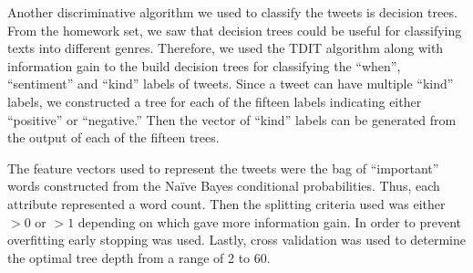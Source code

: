 	Another discriminative algorithm we used to classify the tweets is decision trees. From the homework set, we saw that decision trees could be useful for classifying texts into different genres. Therefore, we used the TDIT algorithm along with information gain to the build decision trees for classifying the ``when'', ``sentiment'' and ``kind'' labels of tweets. Since a tweet can have multiple ``kind'' labels, we constructed a tree for each of the fifteen labels indicating either ``positive'' or ``negative.'' Then the vector of ``kind'' labels can be generated from the output of each of the fifteen trees.

	The feature vectors used to represent the tweets were the bag of ``important'' words constructed from the Naïve Bayes conditional probabilities. Thus, each attribute represented a word count. Then the splitting criteria used was either $>0$ or $>1$ depending on which gave more information gain. In order to prevent overfitting early stopping was used. Lastly, cross validation was used to determine the optimal tree depth from a range of 2 to 60. 